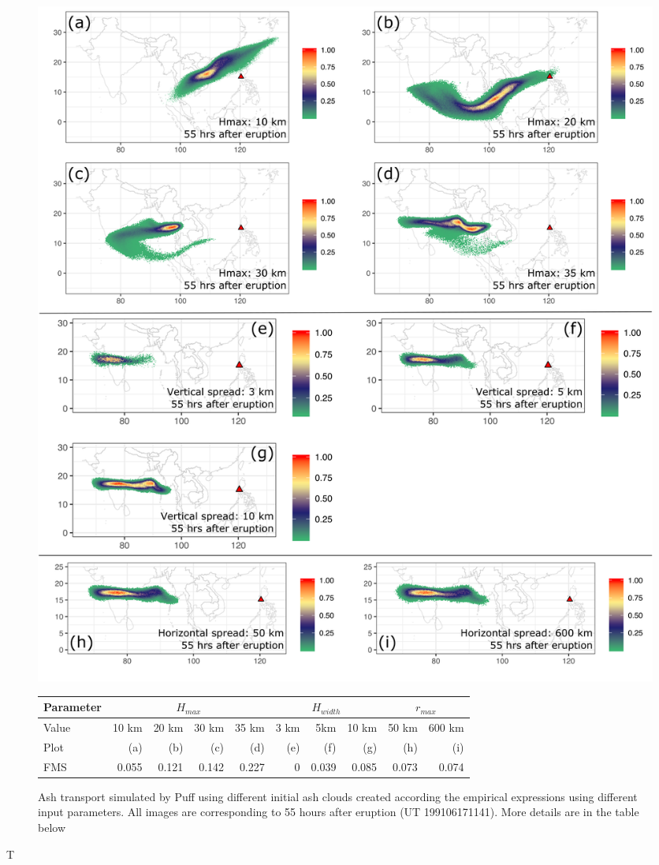 \documentclass[utf8]{frontiersSCNS} %
\begin{document}
\begin{figure}[!htb]
\centering
\includegraphics[width=0.80 \textwidth]{Figures/discussion}
\caption{Ash transport simulated by Puff using different initial ash clouds created according the empirical expressions using different input parameters. All images are corresponding to 55 hours after eruption (UT 199106171141). More details are in the table below}
	 \begin{tabular}{l|rrrr|rrr|rr}
	 \hline
            Parameter& \multicolumn{4}{c|}{$H_{max}$}& \multicolumn{3}{c|}{$H_{width}$} &  \multicolumn{2}{c}{$r_{max}$}\\
	 \cline{2-5}
	 \hline 
	 Value &10 km &20 km &30 km &35 km &3 km & 5km & 10 km &50 km&600 km \\
	 Plot& (a) & (b) & (c) &  (d) & (e) & (f) &  (g) & (h) &(i) \\
            FMS& 0.055 & 0.121& 0.142 &  0.227 & 0& 0.039 & 0.085 & 0.073 & 0.074  \\
	 \hline
	 \end{tabular}
\label{fig:discussion-initial-ash}
\end{figure}
T
\end{document}
